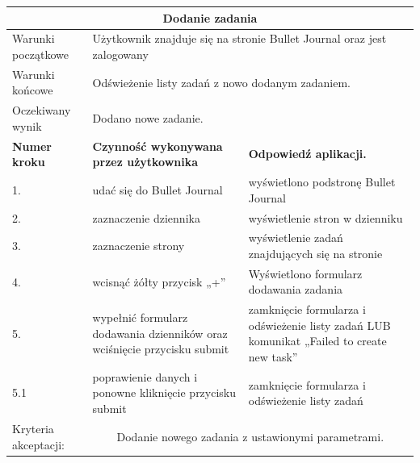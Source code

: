 \documentclass[a4paper,11pt]{report}
\begin{document}
\begin{table}[H]
	\centering
	\begin{tabular}{|p{2cm}|p{6cm}|p{6cm}|}
	\hline
	\multicolumn{3}{|c|}{\textbf{Dodanie zadania}}\\
	\hline
	Warunki początkowe & \multicolumn{2}{|p{12cm}|}{Użytkownik znajduje się na stronie Bullet Journal oraz jest zalogowany}\\
	\hline
	Warunki końcowe & \multicolumn{2}{|p{12cm}|}{Odświeżenie listy zadań z nowo dodanym zadaniem.}\\
	\hline
	Oczekiwany wynik & \multicolumn{2}{|p{12cm}|}{Dodano nowe zadanie.}\\
	\hline
	\textbf{Numer kroku} & \textbf{Czynność wykonywana przez użytkownika} & \textbf{Odpowiedź aplikacji.} \\
	\hline
	1. & udać się do Bullet Journal & wyświetlono podstronę Bullet Journal \\
	\hline
	2. & zaznaczenie dziennika & wyświetlenie stron w dzienniku \\
	\hline
	3. & zaznaczenie strony & wyświetlenie zadań znajdujących się na stronie \\
	\hline
	4. & wcisnąć żółty przycisk „+” & Wyświetlono formularz dodawania zadania \\
	\hline
	5. & wypełnić formularz dodawania dzienników oraz wciśnięcie przycisku submit & zamknięcie formularza i odświeżenie listy zadań LUB komunikat „Failed to create new task” \\
	\hline
	5.1 & poprawienie danych i ponowne kliknięcie przycisku submit & zamknięcie formularza i odświeżenie listy zadań \\
	\hline
	Kryteria akceptacji: & \multicolumn{2}{|c|}{Dodanie nowego zadania z ustawionymi parametrami.} \\
	\hline
	\end{tabular}
\end{table}
\end{document}
